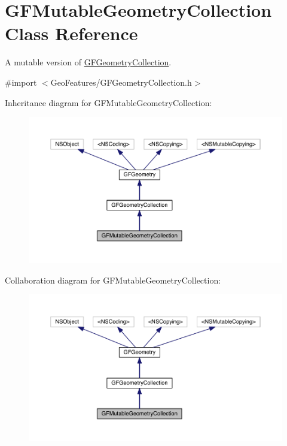 \hypertarget{interface_g_f_mutable_geometry_collection}{}\section{G\+F\+Mutable\+Geometry\+Collection Class Reference}
\label{interface_g_f_mutable_geometry_collection}


A mutable version of \hyperlink{interface_g_f_geometry_collection}{G\+F\+Geometry\+Collection}.  




{\ttfamily \#import $<$Geo\+Features/\+G\+F\+Geometry\+Collection.\+h$>$}



Inheritance diagram for G\+F\+Mutable\+Geometry\+Collection\+:\nopagebreak
\begin{figure}[H]
\begin{center}
\leavevmode
\includegraphics[width=350pt]{interface_g_f_mutable_geometry_collection__inherit__graph}
\end{center}
\end{figure}


Collaboration diagram for G\+F\+Mutable\+Geometry\+Collection\+:\nopagebreak
\begin{figure}[H]
\begin{center}
\leavevmode
\includegraphics[width=350pt]{interface_g_f_mutable_geometry_collection__coll__graph}
\end{center}
\end{figure}

